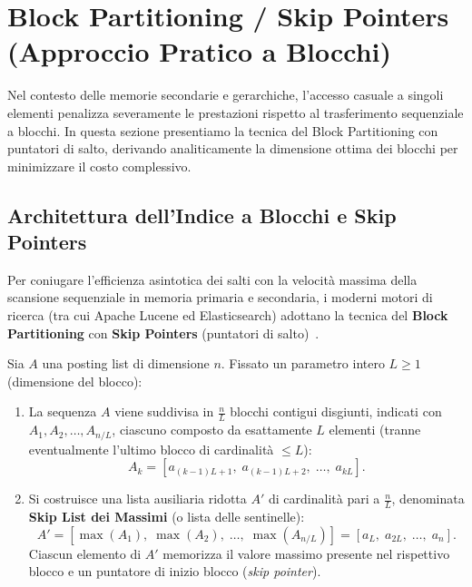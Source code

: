 \FloatBarrier
\section{Block Partitioning / Skip Pointers (Approccio Pratico a Blocchi)}
\label{sec:block-partitioning}

Nel contesto delle memorie secondarie e gerarchiche, l'accesso casuale a singoli elementi penalizza severamente le prestazioni rispetto al trasferimento sequenziale a blocchi. In questa sezione presentiamo la tecnica del Block Partitioning con puntatori di salto, derivando analiticamente la dimensione ottima dei blocchi per minimizzare il costo complessivo.

\FloatBarrier
\subsection{Architettura dell'Indice a Blocchi e Skip Pointers}
Per coniugare l'efficienza asintotica dei salti con la velocità massima della scansione sequenziale in memoria primaria e secondaria, i moderni motori di ricerca (tra cui Apache Lucene ed Elasticsearch) adottano la tecnica del \textbf{Block Partitioning} con \textbf{Skip Pointers} (puntatori di salto)~\cite{moffat1996,manning2008}.

\begin{definition}
Sia $A$ una posting list di dimensione $n$. Fissato un parametro intero $L \ge 1$ (dimensione del blocco):
\begin{enumerate}
  \item La sequenza $A$ viene suddivisa in $\frac{n}{L}$ blocchi contigui disgiunti, indicati con $A_1, A_2, \dots, A_{n/L}$, ciascuno composto da esattamente $L$ elementi (tranne eventualmente l'ultimo blocco di cardinalità $\le L$):
  \begin{equation}
    A_k = [a_{(k-1)L + 1}, \; a_{(k-1)L + 2}, \; \dots, \; a_{kL}].
  \end{equation}
  \item Si costruisce una lista ausiliaria ridotta $A'$ di cardinalità pari a $\frac{n}{L}$, denominata \textbf{Skip List dei Massimi} (o lista delle sentinelle):
  \begin{equation}
    A' = \left[\max(A_1), \; \max(A_2), \; \dots, \; \max(A_{n/L})\right] = \left[a_L, \; a_{2L}, \; \dots, \; a_n\right].
  \end{equation}
  Ciascun elemento di $A'$ memorizza il valore massimo presente nel rispettivo blocco e un puntatore di inizio blocco (\textit{skip pointer}).
\end{enumerate}
\end{definition}

